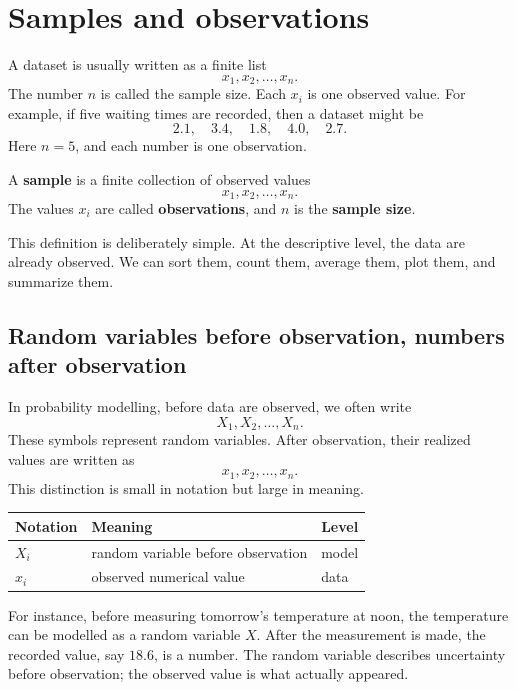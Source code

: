 \section{Samples and observations}

A dataset is usually written as a finite list
\[
x_1,x_2,\ldots,x_n.
\]
The number \(n\) is called the sample size. Each \(x_i\) is one observed value.
For example, if five waiting times are recorded, then a dataset might be
\[
2.1,\quad 3.4,\quad 1.8,\quad 4.0,\quad 2.7.
\]
Here \(n=5\), and each number is one observation.

\begin{definitionbox}
A \textbf{sample} is a finite collection of observed values
\[
x_1,x_2,\ldots,x_n.
\]
The values \(x_i\) are called \textbf{observations}, and \(n\) is the
\textbf{sample size}.
\end{definitionbox}

This definition is deliberately simple. At the descriptive level, the data are
already observed. We can sort them, count them, average them, plot them, and
summarize them.

\subsection*{Random variables before observation, numbers after observation}

In probability modelling, before data are observed, we often write
\[
X_1,X_2,\ldots,X_n.
\]
These symbols represent random variables. After observation, their realized
values are written as
\[
x_1,x_2,\ldots,x_n.
\]
This distinction is small in notation but large in meaning.

\begin{center}
\begin{tabular}{lll}
\toprule
Notation & Meaning & Level \\
\midrule
\(X_i\) & random variable before observation & model \\
\(x_i\) & observed numerical value & data \\
\bottomrule
\end{tabular}
\end{center}

For instance, before measuring tomorrow's temperature at noon, the temperature
can be modelled as a random variable \(X\). After the measurement is made, the
recorded value, say \(18.6\), is a number. The random variable describes
uncertainty before observation; the observed value is what actually appeared.

